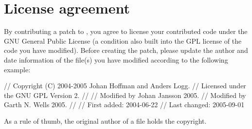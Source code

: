 
\section{License agreement}

By contributing a patch to \package{}, you agree to license your
contributed code under the GNU General Public License (a condition
also built into the GPL license of the code you have modified). Before
creating the patch, please update the author and date information of
the file(s) you have modified according to the following example:

\begin{code}
// Copyright (C) 2004-2005 Johan Hoffman and Anders Logg.
// Licensed under the GNU GPL Version 2.
//
// Modified by Johan Jansson 2005.
// Modified by Garth N. Wells 2005.
//
// First added:  2004-06-22
// Last changed: 2005-09-01
\end{code}

As a rule of thumb, the original author of a file holds the copyright.
